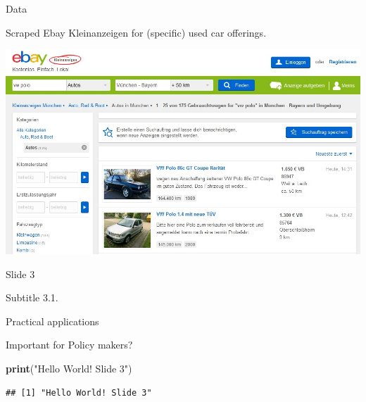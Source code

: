 \documentclass[11pt,ignorenonframetext,]{beamer}
\newenvironment{Shaded}{\begin{snugshade}}{\end{snugshade}}
\newcommand{\KeywordTok}[1]{\textcolor[rgb]{0.13,0.29,0.53}{\textbf{#1}}}
\newcommand{\StringTok}[1]{\textcolor[rgb]{0.31,0.60,0.02}{#1}}
\newcommand{\NormalTok}[1]{#1}
\begin{document}
\begin{frame}{Data}

Scraped Ebay Kleinanzeigen for (specific) used car offerings.

\begin{center}\includegraphics[width=1\linewidth,height=0.8\textheight]{ebay_screenshot} \end{center}

\end{frame}

\begin{frame}[fragile]{Slide 3}

\begin{block}{Subtitle 3.1.}

Practical applications

Important for Policy makers?

\begin{Shaded}
\begin{Highlighting}[]
\KeywordTok{print}\NormalTok{(}\StringTok{"Hello World! Slide 3"}\NormalTok{)}
\end{Highlighting}
\end{Shaded}

\begin{verbatim}
## [1] "Hello World! Slide 3"
\end{verbatim}

\end{block}

\end{frame}
\end{document}
